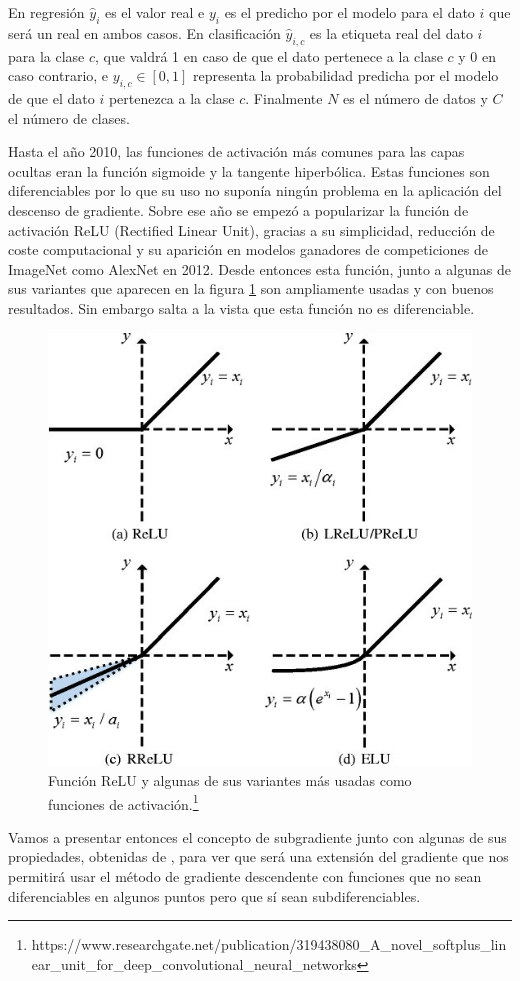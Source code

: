 En regresión $\hat{y}_i$ es el valor real  e $y_i$ es el predicho por el modelo para el dato $i$ que será un real en ambos casos. En clasificación $\hat{y}_{i,c}$ es la etiqueta real del dato $i$ para la clase $c$, que valdrá 1 en caso de que el dato pertenece a la clase $c$ y 0 en caso contrario, e $y_{i,c} \in [0,1]$ representa la probabilidad predicha por el modelo de que el dato $i$ pertenezca a la clase $c$. Finalmente $N$ es el número de datos y $C$ el número de clases. 


Hasta el año 2010, las funciones de activación más comunes para las capas ocultas eran la función sigmoide y la tangente hiperbólica. Estas funciones son diferenciables por lo que su uso no suponía ningún problema en la aplicación del descenso de gradiente. Sobre ese año se empezó a popularizar la función de activación ReLU (Rectified Linear Unit), gracias a su simplicidad, reducción de coste computacional y su aparición en modelos ganadores de competiciones de ImageNet como AlexNet en 2012. Desde entonces esta función, junto a algunas de sus variantes que aparecen en la figura \ref{fig:3.ReLU} son ampliamente usadas y con buenos resultados. Sin embargo salta a la vista que esta función no es diferenciable.


\begin{figure}
    \centering
    \includegraphics[width=0.5\linewidth]{3ReLU&oth.jpg}
    \caption{Función ReLU y algunas de sus variantes más usadas como funciones de activación.\footnote{https://www.researchgate.net/publication/319438080\_A\_novel\_softplus\_linear\_unit\_for\_deep\_convolutional\_neural\_networks}}
    \label{fig:3.ReLU}
\end{figure}



Vamos a presentar entonces el concepto de subgradiente junto con algunas de sus propiedades, obtenidas de \cite{convexSubgrad}, para ver que será una extensión del gradiente que nos permitirá usar el método de gradiente descendente con funciones que no sean diferenciables en algunos puntos pero que sí sean subdiferenciables.

